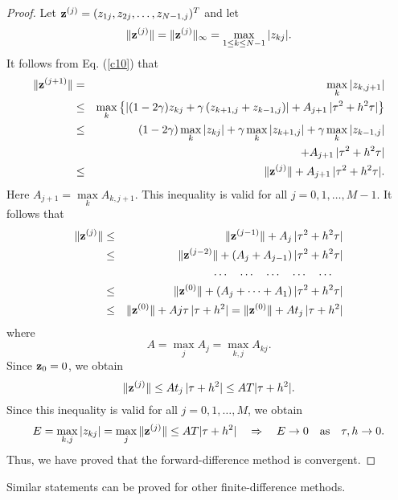 \begin{proof}
\vskip 3mm  
Let ${\bf z}^{(j)}=(z_{1j}, z_{2j}, \dots, z_{N-1,j})^{T}$ and let
\[
\Vert {\bf z}^{(j)}\Vert =\Vert {\bf z}^{(j)}\Vert_{\infty}=
\max\limits_{1\leq k\leq N-1}\vert z_{kj}\vert .
\]
It follows from Eq. (\ref{c10}) that
\begin{eqnarray}
\Vert {\bf z}^{(j+1)} \Vert&=&\max\limits_{k}\vert z_{k,j+1} \vert\nonumber\\
&\leq&
\max\limits_{k}\left\{\left\vert
(1-2\gamma)z_{kj}+\gamma
\left(z_{k+1,j}+z_{k-1,j}\right)\right\vert + A_{j+1} \, \vert\tau^2+h^{2}\tau\vert\right\} \nonumber \\
&\leq&(1 -2\gamma)\max\limits_{k}\vert z_{kj}\vert+
\gamma\max\limits_{k}\vert z_{k+1,j}\vert +
\gamma\max\limits_{k}\vert z_{k-1,j}\vert\nonumber\\
&&\qquad\qquad
+A_{j+1} \, \vert\tau^2+h^{2}\tau\vert \nonumber \\
&\leq&\Vert {\bf z}^{(j)} \Vert+A_{j+1} \, \vert\tau^2+h^{2}\tau\vert. \nonumber
\end{eqnarray}
Here $A_{j+1}=\max\limits_{k}A_{k,j+1}$.
This inequality is valid for all $j=0,1,\dots,M-1$.
It follows that
\begin{eqnarray}
\Vert {\bf z}^{(j)} \Vert&\leq&
\Vert {\bf z}^{(j-1)} \Vert +A_{j} \, \vert\tau^2+h^{2}\tau\vert \nonumber \\
&\leq&\Vert {\bf z}^{(j-2)} \Vert +(A_{j}+A_{j-1}) \, \vert\tau^2+h^{2}\tau\vert \nonumber \\
&&\dots\quad \dots\quad \dots\quad \dots\quad \dots\quad \nonumber \\
&\leq&\Vert {\bf z}^{(0)} \Vert +(A_{j}+\dots +A_{1})\, \vert\tau^2+h^{2}\tau\vert \nonumber \\
&\leq&\Vert {\bf z}^{(0)} \Vert +Aj\tau \, \vert\tau+h^{2}\vert=\Vert {\bf z}^{(0)} \Vert +
A t_{j} \, \vert\tau+h^{2}\vert \nonumber
\end{eqnarray}
where
\[
A=\max_{j}A_{j}=\max_{k,j}A_{kj}.
\]
Since ${\bf z}_{0}=0$, we obtain
\begin{equation}
\Vert {\bf z}^{(j)} \Vert \leq A t_{j} \, \vert\tau+h^{2}\vert \leq A T \vert\tau+h^{2}\vert. \label{c13}
\end{equation}
Since this inequality is valid for all $j=0,1,\dots,M$, we obtain
\[
E= \max\limits_{k,j}\vert z_{kj} \vert=\max\limits_{j}\Vert {\bf z}^{(j)} \Vert\leq A T \vert\tau+h^{2}\vert \quad \Rightarrow \quad E\to 0 \quad {\rm as} \quad \tau,h\to 0.
\]
Thus, we have proved that the forward-difference method is convergent.
\end{proof}
Similar statements can be proved for other finite-difference methods.
 
